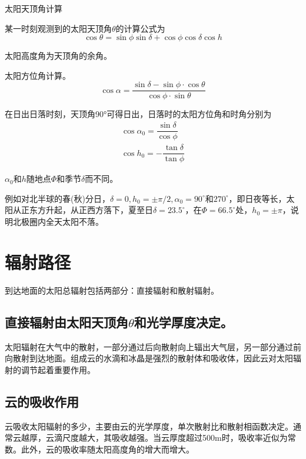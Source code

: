 \documentclass[UTF8,a4paper,11pt,oneside]{ctexbook}
\begin{document}
太阳天顶角计算

某一时刻观测到的太阳天顶角\(\theta\)的计算公式为
\begin{equation}
\cos{}\theta=\sin{}\phi\sin{}\delta+\cos{}\phi\cos{}\delta\cos{}h
\end{equation}

太阳高度角为天顶角的余角。

太阳方位角计算。
\begin{equation}
\cos{}\alpha=\dfrac{\sin{}\delta-\sin{}\phi\cdot\cos{}\theta}{\cos{}\phi\cdot\sin{}\theta}
\end{equation}

在日出日落时刻，天顶角90°可得日出，日落时的太阳方位角和时角分别为
\begin{gather}
    \cos{}\alpha_0=\dfrac{\sin{}\delta}{\cos{}\phi}\\
    \cos{}h_0=-\dfrac{\tan{}\delta}{\tan{}\phi}
\end{gather}

\(\alpha_0\)和\(h\)随地点\(\Phi\)和季节\(\delta\)而不同。

例如对北半球的春(秋)分日，\(\delta=0,h_0=\pm\pi/2,\alpha_0=90^\circ\text{和}270^\circ\)，即日夜等长，太阳从正东方升起，从正西方落下，夏至日\(\delta=23.5^\circ\)，在\(\Phi=66.5^\circ\)处，\(h_0=\pm{}\pi\)，说明北极圈内全天太阳不落。

\section{辐射路径}

到达地面的太阳总辐射包括两部分：直接辐射和散射辐射。

\subsection{直接辐射由太阳天顶角\(\theta\)和光学厚度决定。}

太阳辐射在大气中的散射，一部分通过后向散射向上辐出大气层，另一部分通过前向散射到达地面。组成云的水滴和冰晶是强烈的散射体和吸收体，因此云对太阳辐射的调节起着重要作用。

\subsection{云的吸收作用}

云吸收太阳辐射的多少，主要由云的光学厚度，单次散射比和散射相函数决定。通常云越厚，云滴尺度越大，其吸收越强。当云厚度超过500m时，吸收率近似为常数。此外，云的吸收率随太阳高度角的增大而增大。
\end{document}
